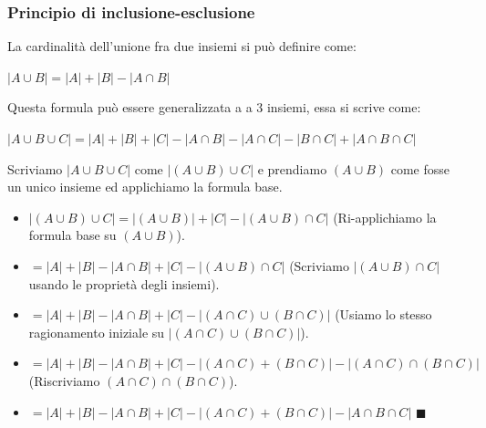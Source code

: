 \subsubsection{Principio di inclusione-esclusione}
La cardinalità dell'unione fra due insiemi si può definire come:
\begin{center}
    $|A \cup B| = |A| + |B| - |A \cap B|$
\end{center}
Questa formula può essere generalizzata a a 3 insiemi, essa si scrive come:
\begin{center}
    $|A \cup B \cup C| = |A| + |B| + |C| - |A\cap B| - |A\cap C| - |B \cap C| + |A \cap B \cap C|$
\end{center}
\begin{demostration}
Scriviamo $|A \cup B \cup C|$ come $|(A \cup B) \cup C|$ e prendiamo $(A \cup B)$ come fosse un unico insieme ed applichiamo la formula base.
\begin{itemize}
    \item $|(A \cup B) \cup C| = |(A \cup B)| + |C| - |(A \cup B) \cap C|$ (Ri-applichiamo la formula base su $(A \cup B)$).
    \item $= |A| + |B| - |A \cap B| + |C| - |(A \cup B) \cap C|$ (Scriviamo $|(A \cup B) \cap C|$ usando le proprietà degli insiemi).
    \item $= |A| + |B| - |A \cap B| + |C| - |(A \cap C) \cup (B \cap C)|$ (Usiamo lo stesso ragionamento iniziale su $|(A \cap C) \cup (B \cap C)|$).
    \item $= |A| + |B| - |A \cap B| + |C| - |(A \cap C) + (B \cap C)| - |(A \cap C) \cap (B \cap C)|$ (Riscriviamo $(A \cap C) \cap (B \cap C)$).
    \item $= |A| + |B| - |A \cap B| + |C| - |(A \cap C) + (B \cap C)| - |A \cap B \cap C|$ $\blacksquare$
\end{itemize}
\end{demostration}

